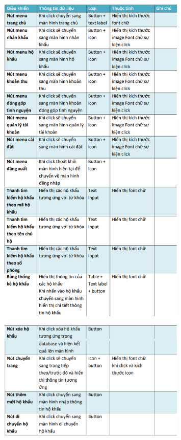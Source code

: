 \documentclass{article}
\begin{document}
\begin{itemize}
\begin{figure}[H]
        \includegraphics[width=0.8\textwidth]{Ảnh chương 4/Hộ khẩu Admin 1.png}
    \end{figure}
    \begin{figure}[H]
        \centering
        \includegraphics[width=0.8\textwidth]{Ảnh chương 4/Hộ khẩu Admin 2.png}

\end{figure}
\end{itemize}
\end{document}
